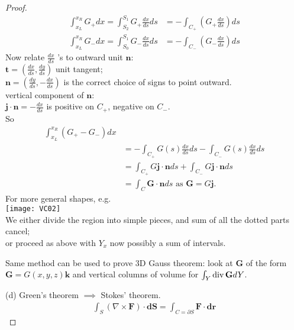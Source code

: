 \documentclass[a4paper]{article}
\begin{document}
\begin{proof}
\begin{equation*}
\begin{aligned}
\int_{x_L}^{x_R} G_+ dx = \int_{S_2}^{S_1} G_+ \frac{dx}{ds} ds &= - \int_{C_+} \left(G_+ \frac{dx}{ds}\right) ds\\
\int_{x_L}^{x_R} G_- dx = \int_{S_0}^{S_1} G_- \frac{dx}{ds} ds &= - \int_{C_-} \left(G_- \frac{dx}{ds}\right) ds
\end{aligned}
\end{equation*}
Now relate $\frac{dx}{ds}$ 's to outward unit $\mathbf{n}$:\\
$\mathbf{t}=\left(\frac{dx}{ds},\frac{dy}{ds}\right)$ unit tangent;\\
$\mathbf{n}=\left(\frac{dy}{ds},-\frac{dx}{ds}\right)$ is the correct choice of signs to point outward.\\
vertical component of $\mathbf{n}$:\\
$\mathbf{j}\cdot\mathbf{n}=-\frac{dx}{ds}$ is positive on $C_+$, negative on $C_-$.\\
So
\begin{equation*}
\begin{aligned}
\int_{x_L}^{x_R} \left(G_+ - G_-\right) dx\\
&=-\int_{C_+} G\left(s\right) \frac{dx}{ds}ds - \int_{C_-} G\left(s\right) \frac{dx}{ds}ds\\
&=\int_{C_+} G \mathbf{j}\cdot\mathbf{n} ds + \int_{C_-} G \mathbf{j}\cdot\mathbf{n} ds\\
&=\int_C \mathbf{G}\cdot\mathbf{n}ds \text{  as  } \mathbf{G}=G\mathbf{j}.
\end{aligned}
\end{equation*}
For more general shapes, e.g.\\
\texttt{[image: VC02]}\\
We either divide the region into simple pieces, and sum of all the dotted parts cancel;\\
or proceed as above with $Y_x$ now possibly a sum of intervals.\\
\begin{rem}
Same method can be used to prove 3D Gauss theorem: look at $\mathbf{G}$ of the form $\mathbf{G}=G\left(x,y,z\right)\mathbf{k}$ and vertical columns of volume for $\int_Y \operatorname{div} \mathbf{G} dY$.
\end{rem}
(d) Green's theorem $\implies$ Stokes' theorem.\\
\begin{equation*}
\begin{aligned}
\int_S \left(\nabla\times\mathbf{F}\right)\cdot \mathbf{dS} = \int_{C=\partial S} \mathbf{F}\cdot\mathbf{dr}

\end{aligned}
\end{equation*}
\end{proof}
\end{document}
